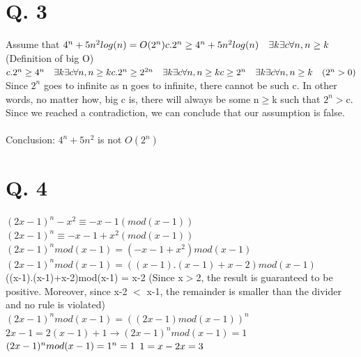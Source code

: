 \documentclass[10pt]{article}
\begin{document}
\section*{Q. 3}
Assume that $4^n+5n^2log(n)=O(2^n)\\
c.2^n\geq 4^n+5n^2log(n) \quad \exists k \exists c \forall n, n\geq k$ (Definition of big O)\\
$c.2^n \geq 4^n \quad \exists k \exists c \forall n, n\geq k\\
c.2^n \geq 2^{2n} \quad \exists k \exists c \forall n, n\geq k\\
c \geq 2^{n} \quad \exists k \exists c \forall n, n\geq k \quad (2^n>0)$\\
Since $2^n$ goes to infinite as n goes to infinite, there cannot be such c. In other words, no matter how, big c is, there will always be some n$\geq$k such that $2^n>$c. Since we reached a contradiction, we can conclude that our assumption is false.\\\\
Conclusion: $4^n+5n^2$ is not $O(2^n)$
\section*{Q. 4}
$(2x-1)^n-x^2\equiv -x-1 (mod(x-1))$\\
$(2x-1)^n\equiv -x-1+x^2 (mod(x-1))$\\
$(2x-1)^n mod(x-1) = (-x-1+x^2)mod(x-1)$\\
$(2x-1)^n mod(x-1) = ((x-1).(x-1)+x-2) mod(x-1)$\\
((x-1).(x-1)+x-2)mod(x-1) = x-2 (Since x$>$2, the result is guaranteed to be positive. Moreover, since x-2 $<$ x-1, the remainder is smaller than the divider and no rule is violated)\\
$(2x-1)^n mod(x-1) = ((2x-1)mod(x-1))^n$\\
$2x-1 = 2(x-1) + 1 \rightarrow (2x-1)^n mod(x-1) = 1$\\
$(2x-1)^n mod(x-1) = 1^n = 1\\$
$1 = x-2\\
x = 3$
\end{document}
